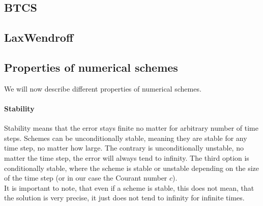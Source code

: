 \subsection{BTCS}
\subsection{LaxWendroff}
\subsection{Properties of numerical schemes}
We will now describe different properties of numerical schemes.
\paragraph{Stability}
Stability means that the error stays finite no matter for arbitrary number of time steps. Schemes can be unconditionally stable, meaning they are stable for any time step, no matter how large. The contrary is unconditionally unstable, no matter the time step, the error will always tend to infinity. The third option is conditionally stable, where the scheme is stable or unstable depending on the size of the time step (or in our case the Courant number $c$).\\
It is important to note, that even if a scheme is stable, this does not mean, that the solution is very precise, it just does not tend to infinity for infinite times. 
